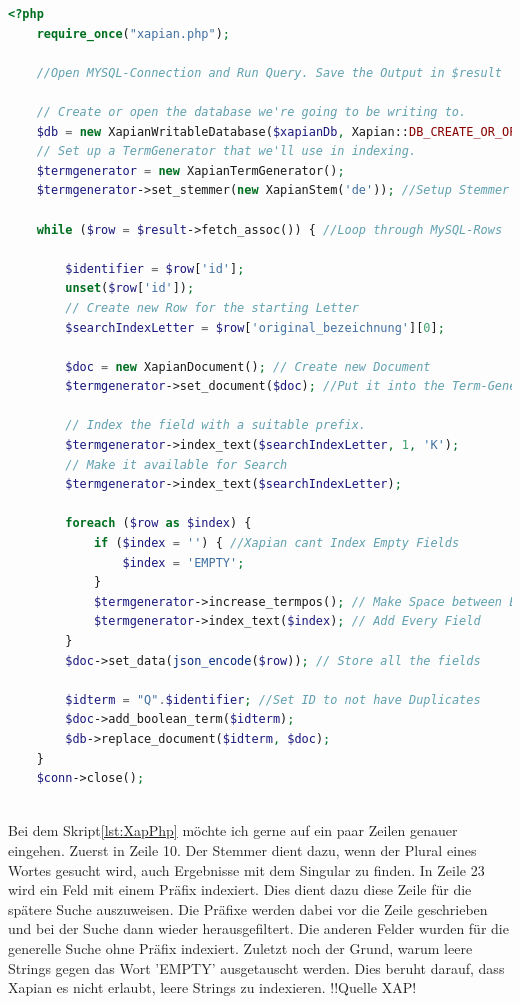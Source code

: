 \begin{lstlisting}[language=php, frame=single, label={lst:XapPhp}, 
	morekeywords={type,uninvertible,indexed,stored,field,multiValued, name}] 
	<?php
	require_once("xapian.php");
	
	//Open MYSQL-Connection and Run Query. Save the Output in $result
	
	// Create or open the database we're going to be writing to.
	$db = new XapianWritableDatabase($xapianDb, Xapian::DB_CREATE_OR_OPEN);
	// Set up a TermGenerator that we'll use in indexing.
	$termgenerator = new XapianTermGenerator();
	$termgenerator->set_stemmer(new XapianStem('de')); //Setup Stemmer
	
	while ($row = $result->fetch_assoc()) { //Loop through MySQL-Rows
	
		$identifier = $row['id'];
		unset($row['id']);
		// Create new Row for the starting Letter
		$searchIndexLetter = $row['original_bezeichnung'][0];

		$doc = new XapianDocument(); // Create new Document
		$termgenerator->set_document($doc); //Put it into the Term-Generator
	
		// Index the field with a suitable prefix.
		$termgenerator->index_text($searchIndexLetter, 1, 'K'); 
		// Make it available for Search
		$termgenerator->index_text($searchIndexLetter); 
	
		foreach ($row as $index) {
			if ($index = '') { //Xapian cant Index Empty Fields
				$index = 'EMPTY';
			}
			$termgenerator->increase_termpos(); // Make Space between Entries
			$termgenerator->index_text($index); // Add Every Field
		}
		$doc->set_data(json_encode($row)); // Store all the fields
	
		$idterm = "Q".$identifier; //Set ID to not have Duplicates
		$doc->add_boolean_term($idterm);
		$db->replace_document($idterm, $doc);
	}
	$conn->close();
	
  \end{lstlisting}

Bei dem Skript\ref{lst:XapPhp} möchte ich gerne auf ein paar Zeilen genauer eingehen. Zuerst in Zeile 10. Der Stemmer dient dazu, wenn der Plural eines Wortes gesucht wird, auch Ergebnisse mit dem Singular zu finden. In Zeile 23 wird ein Feld mit einem Präfix indexiert. Dies dient dazu diese Zeile für die spätere Suche auszuweisen. Die Präfixe werden dabei vor die Zeile geschrieben und bei der Suche dann wieder herausgefiltert. Die anderen Felder wurden für die generelle Suche ohne Präfix indexiert. Zuletzt noch der Grund, warum leere Strings gegen das Wort 'EMPTY' ausgetauscht werden. Dies beruht darauf, dass Xapian es nicht erlaubt, leere Strings zu indexieren. !!Quelle XAP!

